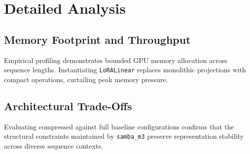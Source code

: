 \section{Detailed Analysis}

\subsection{Memory Footprint and Throughput}
Empirical profiling demonstrates bounded GPU memory allocation across sequence lengths. Instantiating \texttt{LoRALinear} replaces monolithic projections with compact operations, curtailing peak memory pressure.

\subsection{Architectural Trade-Offs}
Evaluating compressed against full baseline configurations confirms that the structural constraints maintained by \texttt{samba_m3} preserve representation stability across diverse sequence contexts.

